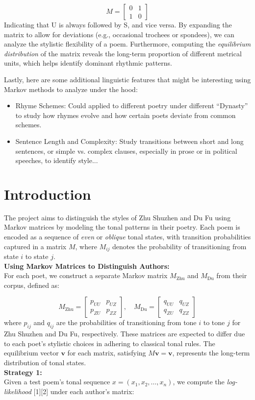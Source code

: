 \documentclass[12pt]{article}
\begin{document}
\[
    M = \begin{bmatrix} 0 & 1 \\ 1 & 0 \end{bmatrix}
\]
Indicating that U is always followed by S, and vice versa. By expanding the matrix to allow for deviations (e.g., occasional trochees or spondees), we can analyze the stylistic flexibility of a poem.
Furthermore, computing the \textit{equilibrium distribution} of the matrix reveals the long-term proportion of different metrical units, which helps identify dominant rhythmic patterns.

Lastly, here are some additional linguistic features that might be interesting using Markov methods to analyze under the hood:
\begin{itemize}
    \item Rhyme Schemes: Could applied to different poetry under different ``Dynasty'' to study how rhymes evolve and how certain poets deviate from common schemes.
    \item Sentence Length and Complexity: Study transitions between short and long sentences, or simple vs. complex clauses, especially in prose or in political speeches, to identify style...
\end{itemize}

\section{Introduction}
The project aims to distinguish the styles of Zhu Shuzhen and Du Fu using Markov matrices by modeling the tonal patterns in their poetry. Each poem is encoded as a sequence of \textit{even} or \textit{oblique} tonal states, with transition probabilities captured in a matrix $M$, where $M_{ij}$ denotes the probability of transitioning from state $i$ to state $j$.
\\
\textbf{Using Markov Matrices to Distinguish Authors: }
\\
For each poet, we construct a separate Markov matrix $M_{\text{Zhu}}$ and $M_{\text{Du}}$ from their corpus, defined as:

\[
    M_{\text{Zhu}} = \begin{bmatrix} p_{UU} & p_{UZ} \\ p_{ZU} & p_{ZZ} \end{bmatrix}, \quad M_{\text{Du}} = \begin{bmatrix} q_{UU} & q_{UZ} \\ q_{ZU} & q_{ZZ} \end{bmatrix}
\]
where $p_{ij}$ and $q_{ij}$ are the probabilities of transitioning from tone $i$ to tone $j$ for Zhu Shuzhen and Du Fu, respectively. These matrices are expected to differ due to each poet's stylistic choices in adhering to classical tonal rules. The equilibrium vector $\mathbf{v}$ for each matrix, satisfying $M \mathbf{v} = \mathbf{v}$, represents the long-term distribution of tonal states.
\\
\textbf{Strategy 1: }
\\
Given a test poem's tonal sequence $x = (x_1, x_2, \ldots, x_n)$, we compute the \textit{log-likelihood} [1][2] under each author's matrix:
\end{document}
